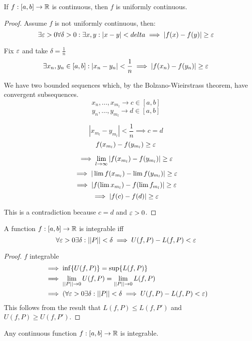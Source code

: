 \documentclass[a4paper,10pt]{article}
\begin{document}
\begin{thm}
	If $f:[a,b] \to \mathbb{R}$ is continuous, then $f$ is uniformly continuous.
\end{thm}

\begin{proof}
	Assume $f$ is not uniformly continuous, then:
	\[ \exists \varepsilon > 0 \forall \delta > 0 : \exists x, y : |x-y| < delta \implies |f(x)-f(y)| \geq \varepsilon \]

	Fix $\varepsilon$ and take $\delta = \frac{1}{n}$
	\[ \exists x_n, y_n \in [a,b] : |x_n - y_n| < \frac{1}{n} \implies |f(x_n)-f(y_n)| \geq \varepsilon \]

	We have two bounded sequences which, by the Bolzano-Wieirstrass theorem, have convergent subsequences.
	\[ x_n, \ldots, x_{m_l} \to c \in [a,b] \]
	\[ y_n, \ldots, y_{m_l} \to d \in [a,b] \]

	\[ |x_{m_l} - y_{m_l}| < \frac{1}{n} \implies c = d \]
	\[ f(x_{m_l})- f(y_{m_l}) \geq \varepsilon \]

	\[ \implies \lim_{l \to \infty} |f(x_{m_l}) - f(y_{m_l})| \geq \varepsilon \]
	\[ \implies | \lim f(x_{m_l}) - \lim f(y_{m_l}) | \geq \varepsilon \]
	\[ \implies | f(\lim x_{m_l}) - f(\lim f_{m_l}) | \geq \varepsilon \]
	\[ \implies |f(c) - f(d)| \geq \varepsilon \]

	This is a contradiction because $c=d$ and $\varepsilon > 0$.
\end{proof}

\begin{thm}
	A function $f:[a,b] \to \mathbb{R}$ is integrable iff
	\[ \forall \varepsilon > 0 \exists \delta : ||P|| < \delta \implies U(f,P) - L(f,P) < \varepsilon \]
\end{thm}

\begin{proof}
	$f$ integrable
	\begin{align*}
		&\implies \inf \{ U(f,P) \} = \sup \{ L(f,P) \} \\
		&\implies \lim_{||P|| \to 0} U(f,P) = \lim_{||P|| \to 0} L(f,P) \\
		&\implies (\forall \varepsilon > 0 \exists \delta : ||P|| < \delta \implies U(f,P) - L(f,P) < \varepsilon)
	\end{align*}
	This follows from the result that $L(f,P) \leq L(f,P')$ and $U(f,P) \geq U(f,P')$.
\end{proof}

\begin{thm}
	Any continuous function $f:[a,b] \to \mathbb{R}$ is integrable.
\end{thm}
\end{document}
